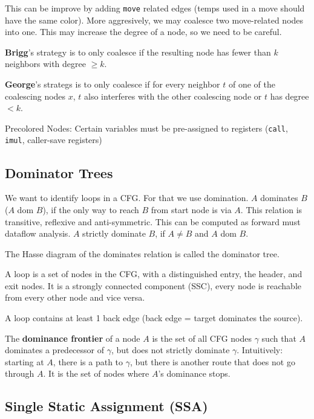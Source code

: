 This can be improve by adding \texttt{move} related edges (temps used in a move should have the same color). More aggresively, we may coalesce two move-related nodes into one. This may increase the degree of a node, so we need to be careful. \medskip

\textbf{Brigg}'s strategy is to only coalesce if the resulting node has fewer than $k$ neighbors with degree $\geq k$. \medskip

\textbf{George}'s strategs is to only coalesce if for every neighbor $t$ of one of the coalescing nodes $x$, $t$ also interferes with the other coalescing node or $t$ has degree $< k$.\medskip
	
Precolored Nodes: Certain variables must be pre-assigned to registers (\texttt{call}, \texttt{imul}, caller-save registers)



\subsection*{Dominator Trees}

We want to identify loops in a CFG. For that we use domination. $A$ dominates $B$ ($A$ dom $B$), if the only way to reach $B$ from start node is via $A$. This relation is transitive, reflexive and anti-symmetric. This can be computed as forward must dataflow analysis. $A$ strictly dominate $B$, if $A \neq B$ and $A$ dom $B$.\medskip

The Hasse diagram of the dominates relation is called the dominator tree.\medskip

A loop is a set of nodes in the CFG, with a distinguished entry, the header, and exit nodes. It is a strongly connected component (SSC), every node is reachable from every other node and vice versa.\medskip

A loop contains at least 1 back edge (back edge = target dominates the source).\medskip

The \textbf{dominance frontier} of a node $A$ is the set of all CFG nodes $\gamma$ such that $A$ dominates a predecessor of $\gamma$, but does not strictly dominate $\gamma$. Intuitively: starting at $A$, there is a path to $\gamma$, but there is another route that does not go through $A$. It is the set of nodes where $A$'s dominance stops.


\subsection*{Single Static Assignment (SSA)}

